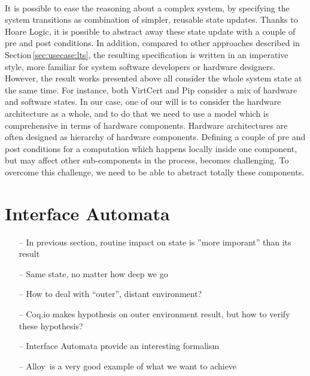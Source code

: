 \paragraph{}
%
It is possible to ease the reasoning about a complex system, by specifying the
system transitions as combination of simpler, reusable state updates.
%
Thanks to Hoare Logic, it is possible to abstract away these state update with a
couple of pre and post conditions.
%
In addition, compared to other approaches described in
Section\,\ref{sec:usecase:lts}, the resulting specification is written in an
imperative style, more familiar for system software developers or hardware
designers.
%
However, the result works presented above all consider the whole system state at
the same time.
%
For instance, both VirtCert and Pip consider a mix of hardware and software
states.
%
In our case, one of our will is to consider the hardware architecture as a
whole, and to do that we need to use a model which is comprehensive in terms of
hardware components.
%
Hardware architectures are often designed as hierarchy of hardware components.
%
Defining a couple of pre and post conditions for a computation which happens
locally inside one component, but may affect other sub-components in the
process, becomes challenging.
%
To overcome this challenge, we need to be able to abstract totally these
components.

\section{Interface Automata} %

\begin{itemize}
\item[--] In previous section, routine impact on state is ''more imporant'' than
  its result
\item[--] Same state, no matter how deep we go
\item[--] How to deal with ``outer'', distant environment?
\item[--] Coq.io makes hypothesis on outer environment result, but how to verify
  these hypothesis?
\item[--] Interface Automata provide an interesting formalism
\item[--] Alloy\,\cite{jackson2012alloy} is a very good example of what we want
  to achieve
\end{itemize}

